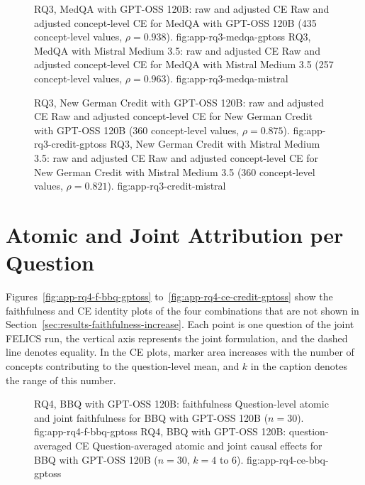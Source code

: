 \begin{figure}[H]
  \centering
    {RQ3, MedQA with GPT-OSS 120B: raw and adjusted CE}%
    {Raw and adjusted concept-level CE for MedQA with GPT-OSS 120B (435 concept-level values, $\rho=0.938$).}%
    {fig:app-rq3-medqa-gptoss}%
  \hfill
    {RQ3, MedQA with Mistral Medium 3.5: raw and adjusted CE}%
    {Raw and adjusted concept-level CE for MedQA with Mistral Medium 3.5 (257 concept-level values, $\rho=0.963$).}%
    {fig:app-rq3-medqa-mistral}%
\end{figure}

\begin{figure}[H]
  \centering
    {RQ3, New German Credit with GPT-OSS 120B: raw and adjusted CE}%
    {Raw and adjusted concept-level CE for New German Credit with GPT-OSS 120B (360 concept-level values, $\rho=0.875$).}%
    {fig:app-rq3-credit-gptoss}%
  \hfill
    {RQ3, New German Credit with Mistral Medium 3.5: raw and adjusted CE}%
    {Raw and adjusted concept-level CE for New German Credit with Mistral Medium 3.5 (360 concept-level values, $\rho=0.821$).}%
    {fig:app-rq3-credit-mistral}%
\end{figure}

\section{Atomic and Joint Attribution per Question}
\label{app:rq4-identity}

Figures~\ref{fig:app-rq4-f-bbq-gptoss} to~\ref{fig:app-rq4-ce-credit-gptoss} show the faithfulness and CE identity plots of the four combinations that are not shown in Section~\ref{sec:results-faithfulness-increase}. Each point is one question of the joint FELICS run, the vertical axis represents the joint formulation, and the dashed line denotes equality. In the CE plots, marker area increases with the number of concepts contributing to the question-level mean, and $k$ in the caption denotes the range of this number.

\begin{figure}[H]
  \centering
    {RQ4, BBQ with GPT-OSS 120B: faithfulness}%
    {Question-level atomic and joint faithfulness for BBQ with GPT-OSS 120B ($n=30$).}%
    {fig:app-rq4-f-bbq-gptoss}%
  \hfill
    {RQ4, BBQ with GPT-OSS 120B: question-averaged CE}%
    {Question-averaged atomic and joint causal effects for BBQ with GPT-OSS 120B ($n=30$, $k=4$ to $6$).}%
    {fig:app-rq4-ce-bbq-gptoss}%
\end{figure}

